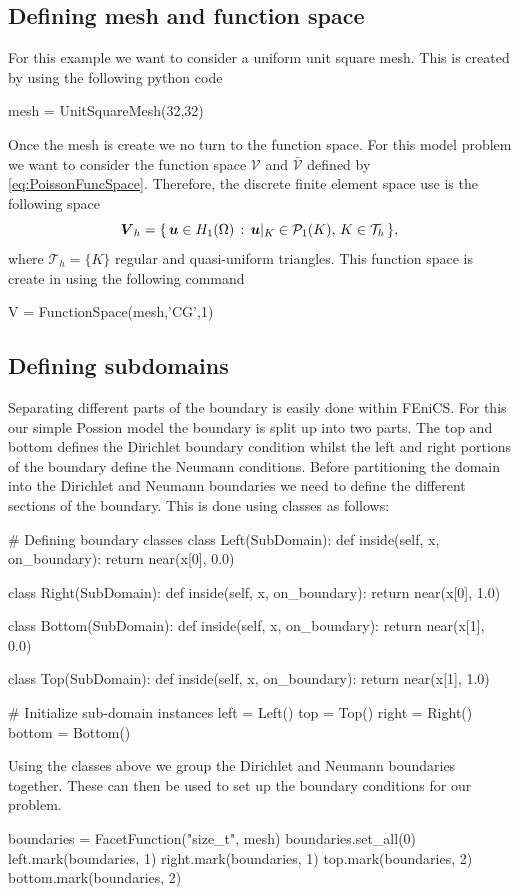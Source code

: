 \subsection{Defining mesh and function space}

For this example we want to consider a uniform unit square mesh. This is created by using the following python code
\begin{pythoncode}
mesh = UnitSquareMesh(32,32)
\end{pythoncode}
Once the mesh is create we no turn to the function space. For this model problem we want to consider the function space $\mathcal{V}$  and $\bar{\mathcal{V}}$ defined by \eqref{eq:PoissonFuncSpace}. Therefore, the discrete finite element space use is the following space
$$\boldsymbol V_h  = \{\, \boldsymbol u\in H_1( \Omega)\, :\, \boldsymbol u|_K \in {\mathcal P}_{1}(K), \, K \in{\mathcal T}_h \, \},$$
where ${\mathcal T}_h=\{K\}$ regular and quasi-uniform triangles. This function space is create in \fenics using the following command
\begin{pythoncode}
V = FunctionSpace(mesh,'CG',1)
\end{pythoncode}

\subsection{Defining subdomains}
Separating different parts of the boundary is easily done within FEniCS. For this our simple Possion model the boundary is split up into two parts. The top and bottom defines the Dirichlet boundary condition whilst the left and right portions of the boundary define the Neumann conditions. Before partitioning the domain into the Dirichlet and Neumann boundaries we need to define the different sections of the boundary. This is done using classes as follows:
\begin{pythoncode}
# Defining boundary classes
class Left(SubDomain):
    def inside(self, x, on_boundary):
        return near(x[0], 0.0)

class Right(SubDomain):
    def inside(self, x, on_boundary):
        return near(x[0], 1.0)

class Bottom(SubDomain):
    def inside(self, x, on_boundary):
        return near(x[1], 0.0)

class Top(SubDomain):
    def inside(self, x, on_boundary):
        return near(x[1], 1.0)

# Initialize sub-domain instances
left = Left()
top = Top()
right = Right()
bottom = Bottom()
\end{pythoncode}
Using the classes above we group the Dirichlet and Neumann boundaries together. These can then be used to set up the boundary conditions for our problem.
\begin{pythoncode}
boundaries = FacetFunction("size_t", mesh)
boundaries.set_all(0)
left.mark(boundaries, 1)
right.mark(boundaries, 1)
top.mark(boundaries, 2)
bottom.mark(boundaries, 2)
\end{pythoncode}

